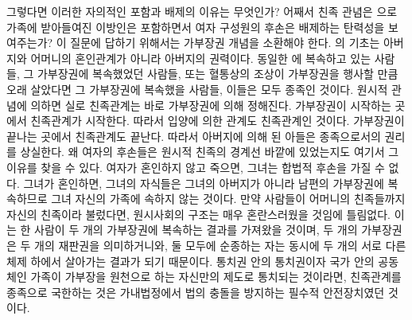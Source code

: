 그렇다면 이러한 자의적인 포함과 배제의 이유는 무엇인가?
어째서 친족 관념은 으로 가족에 받아들여진 이방인은 포함하면서
여자 구성원의 후손은 배제하는 탄력성을 보여주는가?
이 질문에 답하기 위해서는 가부장권 개념을 소환해야 한다.
의 기초는 아버지와 어머니의 혼인관계가 아니라 아버지의 권력이다.
동일한 에 복속하고 있는 사람들,
그 가부장권에 복속했었던 사람들, 또는
혈통상의 조상이 가부장권을 행사할 만큼 오래 살았다면 그 가부장권에
복속했을 사람들, 이들은 모두 종족인 것이다.
원시적 관념에 의하면 실로 친족관계는 바로 가부장권에 의해 정해진다.
가부장권이 시작하는 곳에서 친족관계가 시작한다.
따라서 입양에 의한 관계도 친족관계인 것이다.
가부장권이 끝나는 곳에서 친족관계도 끝난다.
따라서 아버지에 의해 된 아들은 종족으로서의 권리를 상실한다.
왜 여자의 후손들은 원시적 친족의 경계선 바깥에 있었는지도
여기서 그 이유를 찾을 수 있다.
여자가 혼인하지 않고 죽으면, 그녀는 합법적 후손을 가질 수 없다.
그녀가 혼인하면, 그녀의 자식들은 그녀의 아버지가 아니라 남편의 가부장권에
복속하므로 그녀 자신의 가족에 속하지 않는 것이다.
만약 사람들이 어머니의 친족들까지 자신의 친족이라 불렀다면,
원시사회의 구조는 매우 혼란스러웠을 것임에 틀림없다.
이는 한 사람이 두 개의 가부장권에 복속하는 결과를 가져왔을 것이며,
두 개의 가부장권은 두 개의 재판권을 의미하거니와,
둘 모두에 순종하는 자는 동시에 두 개의 서로 다른 체제 하에서 살아가는 결과가
되기 때문이다.
통치권 안의 통치권이자
국가 안의 공동체인 가족이
가부장을 원천으로 하는 자신만의 제도로 통치되는 것이라면,
친족관계를 종족으로 국한하는 것은
가내법정에서 법의 충돌을 방지하는
필수적 안전장치였던 것이다.

